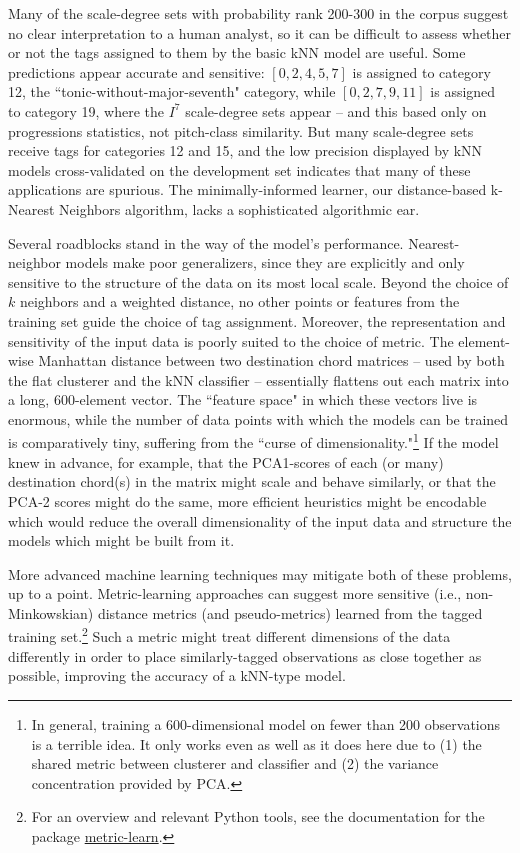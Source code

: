Many of the scale-degree sets with probability rank 200-300 in the corpus suggest no clear interpretation to a human analyst, so it can be difficult to assess whether or not the tags assigned to them by the basic kNN model are useful.  Some predictions appear accurate and sensitive: $[0,2,4,5,7]$ is assigned to category 12, the ``tonic-without-major-seventh" category, while $[0,2,7,9,11]$ is assigned to category 19, where the $I^7$ scale-degree sets appear -- and this based only on progressions statistics, not pitch-class similarity.  But many scale-degree sets receive tags for categories 12 and 15, and the low precision displayed by kNN models cross-validated on the development set indicates that many of these applications are spurious.  The minimally-informed learner, our distance-based k-Nearest Neighbors algorithm, lacks a sophisticated algorithmic ear.

Several roadblocks stand in the way of the model's performance.  Nearest-neighbor models make poor generalizers, since they are explicitly and only sensitive to the structure of the data on its most local scale.  Beyond the choice of $k$ neighbors and a weighted distance, no other points or features from the training set guide the choice of tag assignment.  Moreover, the representation and sensitivity of the input data is poorly suited to the choice of metric.  The element-wise Manhattan distance between two destination chord matrices -- used by both the flat clusterer and the kNN classifier -- essentially flattens out each matrix into a long, 600-element vector.  The ``feature space" in which these vectors live is enormous, while the number of data points with which the models can be trained is comparatively tiny, suffering from the ``curse of dimensionality."\footnote{In general, training a 600-dimensional model on fewer than 200 observations is a terrible idea.  It only works even as well as it does here due to (1) the shared metric between clusterer and classifier and (2) the variance concentration provided by PCA.}  If the model knew in advance, for example, that the PCA1-scores of each (or many) destination chord(s) in the matrix might scale and behave similarly, or that the PCA-2 scores might do the same, more efficient heuristics might be encodable which would reduce the overall dimensionality of the input data and structure the models which might be built from it.

More advanced machine learning techniques may mitigate both of these problems, up to a point.  Metric-learning approaches can suggest more sensitive (i.e., non-Minkowskian) distance metrics (and pseudo-metrics) learned from the tagged training set.\footnote{For an overview and relevant Python tools, see the documentation for the package \href{https://github.com/all-umass/metric-learn}{metric-learn}.}  Such a metric might treat different dimensions of the data differently in order to place similarly-tagged observations as close together as possible, improving the accuracy of a kNN-type model. 

